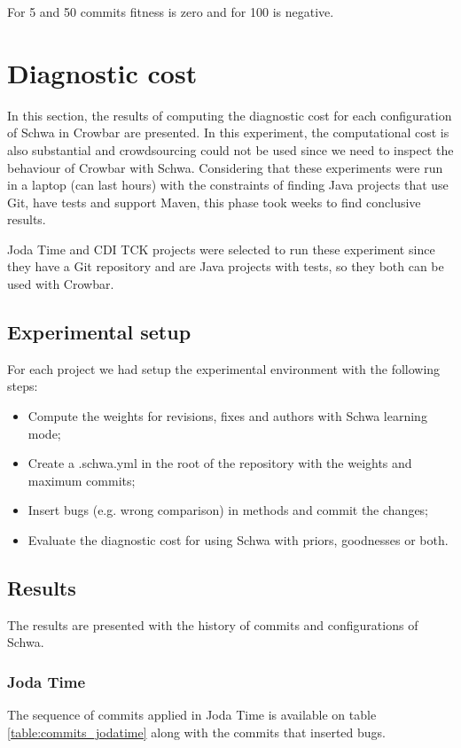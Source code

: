 For 5 and 50 commits fitness is zero and for 100 is negative.

\section{Diagnostic cost}
In this section, the results of computing the diagnostic cost for each
configuration of Schwa in Crowbar are presented. In this experiment, the
computational cost is also substantial and crowdsourcing could not be used
since we need to inspect the behaviour of Crowbar with Schwa. Considering that
these experiments were run in a laptop (can last hours) with the constraints of
finding Java projects that use Git, have tests and support Maven, this phase
took weeks to find conclusive results.

Joda Time and CDI TCK projects were selected to run these experiment since they
have a Git repository and are Java projects with tests, so they both can be used
with Crowbar.

\subsection{Experimental setup}
For each project we had setup the experimental environment with the following
steps:

\begin{itemize}
\item Compute the weights for revisions, fixes and authors with Schwa learning
mode;
\item Create a .schwa.yml in the root of the repository with the weights and
maximum commits;
\item Insert bugs (e.g. wrong comparison) in methods and commit the changes;
\item Evaluate the diagnostic cost for using Schwa with priors, goodnesses or
both.
\end{itemize}


\subsection{Results}
The results are presented with the history of commits and configurations of
Schwa.

\subsubsection{Joda Time}
The sequence of commits applied in Joda Time is available on table
\ref{table:commits_jodatime} along with the commits that inserted bugs.

